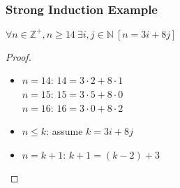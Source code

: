 \documentclass[dvipsnames]{beamer}
\begin{document}
\begin{frame}
  \frametitle{Strong Induction Example}

  \begin{theorem}
    $\forall n \in \mathbb{Z}^+, n \geq 14~\exists i,j \in \mathbb{N}~[n=3i+8j]$
  \end{theorem}

  \pause
  \begin{proof}
    \begin{itemize}
      \item $n=14$: $14=3 \cdot 2 + 8 \cdot 1$\\
        $n=15$: $15=3 \cdot 5 + 8 \cdot 0$\\
        $n=16$: $16=3 \cdot 0 + 8 \cdot 2$

      \pause
      \item $n \leq k$: assume $k=3i+8j$

      \pause
      \item $n=k+1$: $k+1=(k-2)+3$
    \end{itemize}
  \end{proof}
\end{frame}
%
%
%
%
%
%
\end{document}
